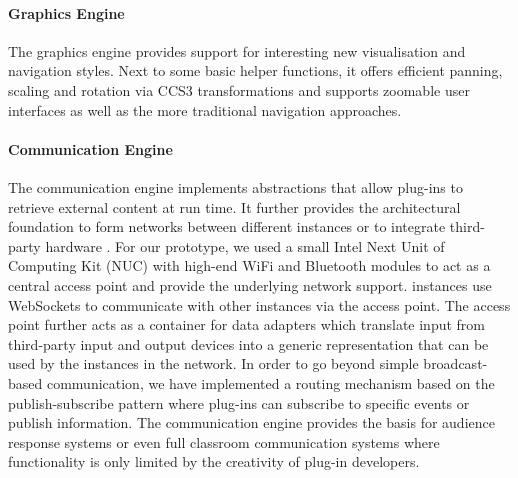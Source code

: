 \documentclass[a4paper,12pt]{report}
\begin{document}
     \paragraph{Graphics Engine} The graphics engine provides support for
      interesting new visualisation and navigation styles. Next to some basic
      helper functions, it offers efficient panning, scaling and rotation via
      CCS3 transformations and supports zoomable user interfaces as well as the
      more traditional navigation approaches.

     \paragraph{Communication Engine} The communication engine implements
      abstractions that allow plug-ins to retrieve external content at run
      time. It further provides the architectural foundation to form networks
      between different \mxp instances or to integrate third-party hardware
      \citep{roels-2}. For our \mxp prototype, we used a small Intel Next Unit
      of Computing Kit (NUC) with high-end WiFi and Bluetooth modules to act as
      a central access point and provide the underlying network support. \mxp
      instances use WebSockets to communicate with other \mxp instances via the
      access point. The access point further acts as a container for data
      adapters which translate input from third-party input and output devices
      into a generic representation that can be used by the \mxp instances in
      the network. In order to go beyond simple broadcast-based communication,
      we have implemented a routing mechanism based on the publish-subscribe
      pattern where plug-ins can subscribe to specific events or publish
      information. The communication engine provides the basis for audience
      response systems \citep{roels-2} or even full classroom communication
      systems where functionality is only limited by the creativity of plug-in
      developers.
\end{document}
